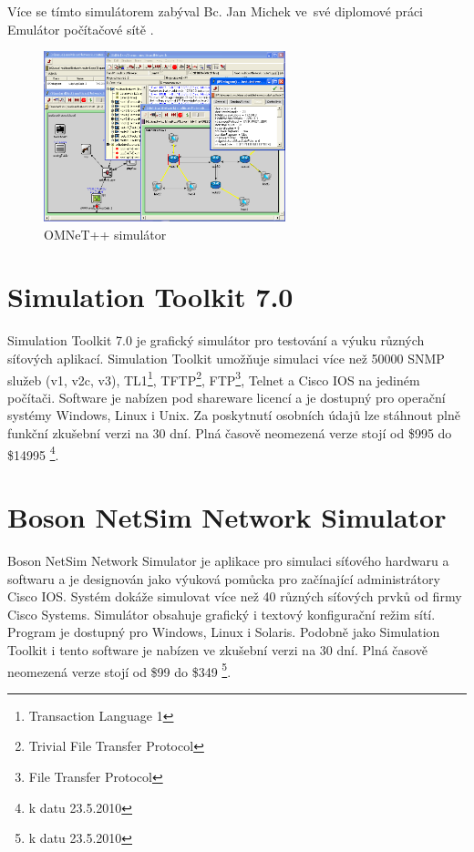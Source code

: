 Více se tímto simulátorem zabýval Bc. Jan Michek ve~své diplomové práci Emulátor počítačové sítě \cite{reserse:omnet_dp}.

\begin{figure}[h]
\begin{center}
\includegraphics[width=7cm]{figures/r_omnet}
\caption{OMNeT++ simulátor}
\label{fig:r_omnet}
\end{center}
\end{figure}


\section{Simulation Toolkit 7.0} 
Simulation Toolkit 7.0 \cite{reserse:adventnet} je grafický simulátor pro testování a výuku různých síťových aplikací. Simulation Toolkit umožňuje simulaci více než 50000 SNMP služeb (v1, v2c, v3), TL1\footnote{Transaction Language 1}, TFTP\footnote{Trivial File Transfer Protocol }, FTP\footnote{File Transfer Protocol}, Telnet a Cisco IOS na jediném počítači. Software je nabízen pod shareware licencí a je dostupný pro operační systémy Windows, Linux i Unix. Za poskytnutí osobních údajů lze stáhnout plně funkční zkušební verzi na 30 dní. Plná časově neomezená verze stojí od \$995 do \$14995 \footnote{k datu 23.5.2010}.


\section{Boson NetSim Network Simulator} 
Boson NetSim Network Simulator \cite{reserse:boson} je aplikace pro simulaci síťového hardwaru a softwaru a je designován jako výuková pomůcka pro začínající administrátory Cisco IOS. Systém dokáže simulovat více než 40 různých síťových prvků od firmy Cisco Systems. Simulátor obsahuje grafický i textový konfigurační režim sítí. Program je dostupný pro Windows, Linux i Solaris. Podobně jako Simulation Toolkit i tento software je nabízen ve zkušební verzi na 30 dní. Plná časově neomezená verze stojí od \$99 do \$349 \footnote{k datu 23.5.2010}.

